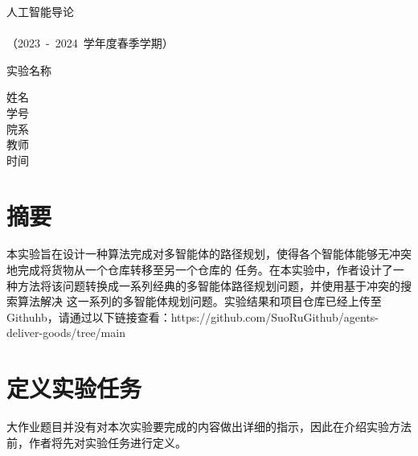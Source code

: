 \documentclass[UTF8]{ctexart}  %
\begin{document}
\begin{titlepage} %
        \heiti
        \vspace*{100pt}
        \begin{center}
            \fontsize{48pt}{0} 人\quad 工\quad 智\quad 能\quad 导\quad 论\\
            \vspace*{36pt}
            \\
            \vspace*{48pt}
            \LARGE（2023\ -\ 2024\ 学年度\quad 春季学期）\\
            \vspace*{48pt}

            \LARGE 实验名称\ \ \underline{}\\
            \vspace*{72pt}

            \heiti\Large 姓名\ \ \underline{}\\
            \heiti\Large 学号\ \ \underline{}\\
            \heiti\Large 院系\ \ \underline{}\\
            \heiti\Large 教师\ \ \underline{}\\
			\heiti\Large 时间\ \ \underline{}\\
        \end{center}
\end{titlepage}

\tableofcontents %
\thispagestyle{empty}

\newpage %
\section{摘要}
本实验旨在设计一种算法完成对多智能体的路径规划，使得各个智能体能够无冲突地完成将货物从一个仓库转移至另一个仓库的
任务。在本实验中，作者设计了一种方法将该问题转换成一系列经典的多智能体路径规划问题，并使用基于冲突的搜索算法解决
这一系列的多智能体规划问题。实验结果和项目仓库已经上传至Githuhb，请通过以下链接查看：https://github.com/SuoRuGithub/agents-deliver-goods/tree/main

\section{定义实验任务}
大作业题目并没有对本次实验要完成的内容做出详细的指示，因此在介绍实验方法前，作者将先对实验任务进行定义。
\end{document}
